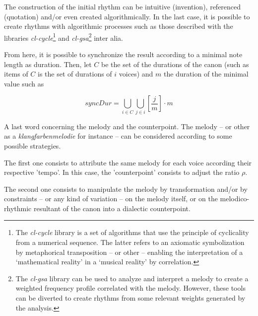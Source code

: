 \bigskip

 The construction of the initial rhythm can be intuitive (invention), referenced (quotation) and/or even created algorithmically. In the last case, it is possible to create rhythms with algorithmic processes such as those described with the libraries \textsl{cl-cycle}\footnote{The \textsl{cl-cycle} library is a set of algorithms that use the principle of cyclicality from a numerical sequence. The latter refers to an axiomatic symbolization by metaphorical transposition -- or other -- enabling the interpretation of a `mathematical reality' in a `musical reality' by correlation.} and \textsl{cl-gsa}\footnote{The \textsl{cl-gsa} library can be used to analyze and interpret a melody to create a weighted frequency profile correlated with the melody. However, these tools can be diverted to create rhythms from some relevant weights generated by the analysis.} inter alia.
 
 \bigskip
 
From here, it is possible to synchronize the result according to a minimal note length as duration. Then, let $C$ be the set of the durations of the canon (such as items of $C$ is the set of durations of $i$ voices) and $m$ the duration of the minimal value such as

\[
syncDur = \displaystyle \bigcup\limits_{i \in C} \bigcup\limits_{j \in i} \displaystyle \left [ \frac{j}{m} \right ] \cdot m
 \]
 



 

 
 \bigskip
%
 A last word concerning the melody and the counterpoint. The melody -- or other as a \textit{klangfarbenmelodie} for instance -- can be considered according to some possible strategies.

The first one consists to attribute the same melody for each voice according their respective 'tempo'. In this case, the 'counterpoint' consists to adjust the ratio $\rho$.

The second one consists to manipulate the melody by transformation and/or by constraints -- or any kind of variation -- on the melody itself, or on the melodico-rhythmic resultant of the canon into a dialectic counterpoint. 


